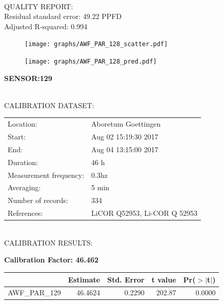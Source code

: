 \documentclass[oneside]{report}
\begin{document}
\hrulefill\\
QUALITY REPORT:\\
Residual standard error: 49.22 PPFD\\
Adjusted R-squared: 0.994



\begin{figure}[H]
  \centering
  \texttt{[image: graphs/AWF\_PAR\_128\_scatter.pdf]}
\end{figure}




\begin{figure}[H]
  \centering
  \texttt{[image: graphs/AWF\_PAR\_128\_pred.pdf]}
\end{figure}

\pagebreak


\begin{center}
\large{\textbf{SENSOR:129}}\\
\end{center}

\hrulefill\\
CALIBRATION DATASET:\\
\begin{table}[h!]
  \centering
  \label{tab:table1}
  \begin{tabular}{ll}
    Location: & Aboretum Goettingen\\ 
    
    
    Start:  & Aug 02 15:19:30 2017 \\
    End:   & Aug 04 13:15:00 2017\\ 
    Duration: & 46 h\\
    Measurement frequency: & 0.3hz\\
    Averaging:  &5 min\\
    Number of records: & 334 \\
    References: & LiCOR Q52953, Li-COR Q 52953 \\
  \end{tabular}
\end{table}

\hrulefill\\
CALIBRATION RESULTS:\\


\begin{center}
\textbf{\large{Calibration Factor: 46.462}}\\
\end{center}
\begin{table}[ht]
\centering
\begin{tabular}{rrrrr}
  \hline
 & Estimate & Std. Error & t value & Pr($>$$|$t$|$) \\ 
  \hline
AWF\_PAR\_129 & 46.4624 & 0.2290 & 202.87 & 0.0000 \\ 
   \hline
\end{tabular}
\end{table}
\end{document}
